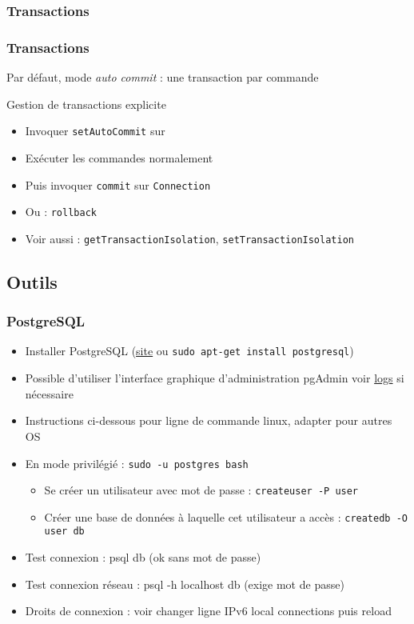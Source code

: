 \documentclass[english, french]{beamer}
\begin{document}
\subsubsection{Transactions}
\begin{frame}
	\frametitle{Transactions}
	Par défaut, mode \emph{auto commit} : une transaction par commande
	\begin{block}{Gestion de transactions explicite}
		\begin{itemize}
			\item Invoquer \texttt{setAutoCommit} sur 
			\item Exécuter les commandes normalement
			\item Puis invoquer \texttt{commit} sur \texttt{Connection}
			\item Ou : \texttt{rollback}
			\item Voir aussi : \texttt{getTransactionIsolation}, \texttt{setTransactionIsolation}
		\end{itemize}
	\end{block}
\end{frame}

\subsection{Outils}
\begin{frame}
	\frametitle{PostgreSQL}
	\begin{itemize}
		\item Installer PostgreSQL (\href{http://www.postgresql.org/}{site} {\tiny ou \texttt{sudo apt-get install postgresql}})
		\item Possible d’utiliser l’interface graphique d’administration pgAdmin {\tiny voir \href{https://wiki.postgresql.org/wiki/Troubleshooting_Installation\#Collect_the_installer_log_file}{logs} si nécessaire}
		\item Instructions ci-dessous pour ligne de commande linux, adapter pour autres OS
		\item En mode privilégié : \texttt{sudo -u postgres bash}
		\begin{itemize}
			\item Se créer un utilisateur avec mot de passe : \texttt{createuser -P user}
			\item Créer une base de données à laquelle cet utilisateur a accès : \texttt{createdb -O user db}
		\end{itemize}
		\item Test connexion : psql db (ok sans mot de passe)
		\item Test connexion réseau : psql -h localhost db (exige mot de passe)
		\item Droits de connexion : voir   {\tiny changer ligne IPv6 local connections puis reload}
	\end{itemize}
\end{frame}
\end{document}
